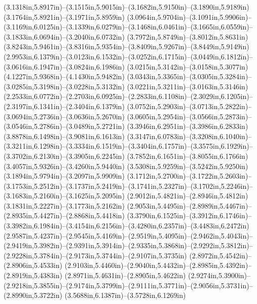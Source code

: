 (3.1318in,5.8917in)--(3.1515in,5.9015in)--(3.1682in,5.9150in)--(3.1890in,5.9189in) (3.1764in,5.8921in)--(3.1971in,5.8959in) (3.0964in,5.9704in)--(3.1091in,5.9906in)--(3.1169in,6.0125in)--(3.1339in,6.0279in)--(3.1468in,6.0461in)--(3.1665in,6.0559in)--(3.1833in,6.0694in)--(3.2040in,6.0732in) (3.7972in,5.8749in)--(3.8012in,5.8631in) (3.8243in,5.9461in)--(3.8316in,5.9354in)--(3.8409in,5.9267in)--(3.8449in,5.9149in) (2.9953in,6.1379in)--(3.0123in,6.1532in)--(3.0252in,6.1715in)--(3.0449in,6.1812in)--(3.0616in,6.1947in)--(3.0824in,6.1986in) (3.0215in,5.3142in)--(3.0158in,5.3077in) (4.1227in,5.9368in)--(4.1430in,5.9482in) (3.0343in,5.3365in)--(3.0305in,5.3284in)--(3.0285in,5.3198in)--(3.0228in,5.3132in) (3.0221in,5.3211in)--(3.0163in,5.3146in) (2.2533in,6.0772in)--(2.2703in,6.0925in)--(2.2833in,6.1108in)--(2.3029in,6.1205in)--(2.3197in,6.1341in)--(2.3404in,6.1379in) (3.0752in,5.2903in)--(3.0713in,5.2822in)--(3.0694in,5.2736in)--(3.0636in,5.2670in) (3.0605in,5.2954in)--(3.0566in,5.2873in)--(3.0546in,5.2786in)--(3.0489in,5.2721in) (3.3946in,6.2951in)--(3.3986in,6.2833in) (3.8878in,6.1498in)--(3.9081in,6.1613in) (3.3147in,6.0783in)--(3.3208in,6.1040in)--(3.3211in,6.1298in)--(3.3334in,6.1519in)--(3.3404in,6.1757in)--(3.3575in,6.1929in)--(3.3702in,6.2130in)--(3.3905in,6.2245in) (3.7852in,6.1651in)--(3.8055in,6.1766in) (3.4057in,5.9326in)--(3.4260in,5.9440in) (3.5308in,5.9259in)--(3.5242in,5.9250in) (3.1894in,5.9794in)--(3.2097in,5.9909in) (3.1712in,5.2700in)--(3.1722in,5.2603in)--(3.1753in,5.2512in)--(3.1737in,5.2419in)--(3.1741in,5.2327in)--(3.1702in,5.2246in)--(3.1683in,5.2160in)--(3.1625in,5.2095in) (2.9012in,5.4821in)--(2.8946in,5.4812in) (3.1831in,5.2227in)--(3.1773in,5.2162in) (2.9053in,5.4495in)--(2.8989in,5.4467in)--(2.8935in,5.4427in)--(2.8868in,5.4418in) (3.3790in,6.1525in)--(3.3912in,6.1746in)--(3.3982in,6.1984in)--(3.4154in,6.2156in)--(3.4280in,6.2357in)--(3.4483in,6.2472in) (2.9587in,5.4237in)--(2.9545in,5.4169in)--(2.9519in,5.4095in)--(2.9462in,5.4043in)--(2.9419in,5.3982in)--(2.9391in,5.3914in)--(2.9335in,5.3868in)--(2.9292in,5.3812in)--(2.9228in,5.3784in)--(2.9173in,5.3744in)--(2.9107in,5.3735in) (2.8972in,5.4542in)--(2.8906in,5.4533in) (2.9103in,5.4460in)--(2.9040in,5.4432in)--(2.8985in,5.4392in)--(2.8919in,5.4383in) (2.8971in,5.4631in)--(2.8905in,5.4622in) (2.9274in,5.3900in)--(2.9218in,5.3855in)--(2.9174in,5.3799in)--(2.9111in,5.3771in)--(2.9056in,5.3731in)--(2.8990in,5.3722in) (3.5688in,6.1387in)--(3.5728in,6.1269in) 